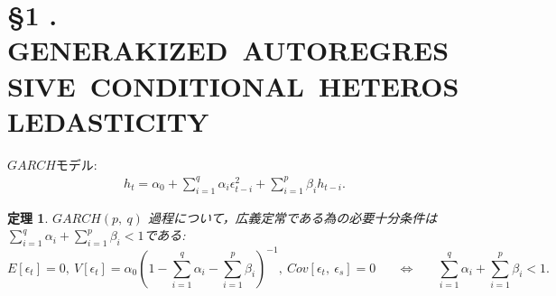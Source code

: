 \documentclass[8pt]{jsarticle}
\newcommand{\Section}[2]{\section*{\S #1 .\hspace{5pt} #2}}
\newtheorem{prop}{定理}
\begin{document}
\Section{1}{GENERAKIZED\ AUTOREGRESSIVE\ CONDITIONAL\ HETEROSLEDASTICITY}

$GARCH$モデル:
\begin{eqnarray*}
	h_t = \alpha_0 + \sum_{i=1}^{q} \alpha_i \epsilon_{t-i}^2 + \sum_{i=1}^{p} \beta_i h_{t-i} .
\end{eqnarray*}

\begin{boxnote}
	\begin{prop}
	$GARCH(p,\ q)$ 過程について，広義定常である為の必要十分条件は$\sum_{i=1}^{q} \alpha_i + \sum_{i=1}^{p} \beta_i < 1$である:
	\[
		E[\epsilon_t]=0,\ V[\epsilon_t]=\alpha_0 \left( 1 - \sum_{i=1}^{q} \alpha_i - \sum_{i=1}^{p} \beta_i \right)^{-1},\ Cov[\epsilon_t,\ \epsilon_s]=0
		\hspace{20pt} \Leftrightarrow \hspace{20pt}
		\sum_{i=1}^{q} \alpha_i + \sum_{i=1}^{p} \beta_i < 1.
	\]
	\end{prop}
\end{boxnote}
\end{document}
